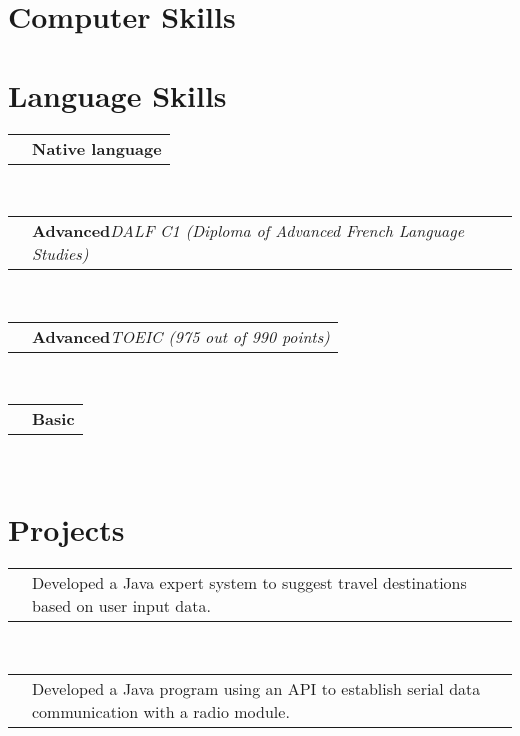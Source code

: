 \documentclass[11pt,a4paper,sans]{moderncv}
\makeatletter
\renewcommand*{\cvlanguage}[3]{%
  \cvline{#1}{\textbf{#2}\hspace*{\separatorcolumnwidth}\emph{#3}}}
\renewcommand*{\cvline}[3][.25em]{%
	  \begin{tabular}{@{}p{\hintscolumnwidth}@{\hspace{\separatorcolumnwidth}}p{\maincolumnwidth}@{}}%
          \centering\hintfont{#2} &{#3}%
	  \end{tabular}\\[#1]}
\makeatother
\begin{document}
\section{Computer Skills}
\SECTIONSPACE
\section{Language Skills}
\cvlanguage{Portuguese}{Native language}{}
\cvlanguage{French}{Advanced}{DALF C1 (Diploma of Advanced French Language Studies)}
\cvlanguage{English}{Advanced}{TOEIC (975 out of 990 points)}
\cvlanguage{Japanese}{Basic}{}
\SECTIONSPACE
\section{Projects}
\cvline{Artificial Intelligence}{Developed a Java expert system to suggest travel destinations based on user input data. \newline{\emph{Implemented the forward and backward chaining methods}} \newline{\emph{Designed the graphic user interface in Swing}}\ENTRYSPACE}
\cvline{Data Analysis}{Developed a Java program using an API to establish serial data communication with a radio module.  \newline{\emph{Wrote the documentation and a guide on how to make further improvements}} \newline{\emph{Employed Git version control system}}}
\end{document}
